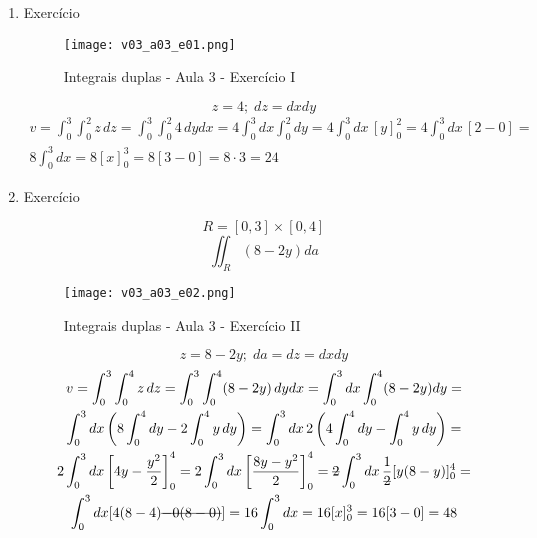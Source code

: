 \begin{enumerate}
	\item Exercício
	
	\begin{figure}[htb]
		\caption{Integrais duplas - Aula 3 - Exercício I}
		\label{v03_a03_e01}
		\centering
		\texttt{[image: v03\_a03\_e01.png]}		
	\end{figure}
	
	\begin{equation*}
		z = 4;\; dz = dx dy	
	\end{equation*}	
	\begin{gather*}
		v = \int_0^3 \int_0^2 z\, dz = \int_0^3 \int_0^2 4\, dy dx = 4\int_0^3 dx \int_0^2 dy = 4\int_0^3 dx\, [y]_0^2 = 4\int_0^3 dx\, [2 - 0] =\\ 8\int_0^3 dx = 8[x]_0^3 = 8[3 - 0] = 8 \cdot 3 = 24
	\end{gather*}
		
	\item Exercício
	
	\begin{equation*}
		R = [0, 3] \times [0,4]
	\end{equation*}
	\begin{equation*}
		\iint_R (8 - 2y) da
	\end{equation*}
	
	\begin{figure}[htb]
		\caption{Integrais duplas - Aula 3 - Exercício II}
		\label{v03_a03_e02}
		\centering
		\texttt{[image: v03\_a03\_e02.png]}		
	\end{figure}	
	
	\begin{equation*}
		z = 8 - 2y;\; da = dz = dx dy
	\end{equation*}
	\begin{gather*}
		v = \int_0^3 \int_0^4 z\,dz = \int_0^3 \int_0^4(8 - 2y)\, dy dx = \int_0^3 dx \int_0^4(8 - 2y) dy =\\ \int_0^3 dx \left(8\int_0^4 dy - 2\int_0^4 y\,dy\right) = \int_0^3 dx\, 2\left(4\int_0^4 dy - \int_0^4 y\,dy\right) =\\ 2\int_0^3 dx \left[4y - \dfrac{y^2}{2}\right]_0^4 = 2\int_0^3 dx \left[\dfrac{8y - y^2}{2}\right]_0^4 = \overstrike{2}\int_0^3 dx\, \dfrac{1}{\overstrike{2}}[y(8 - y)]_0^4 =\\ \int_0^3 dx[4(8 - 4) \overstrike{- 0(8 - 0)}] = 16\int_0^3 dx = 16[x]_0^3 = 16[3 - 0] = 48
	\end{gather*}
\end{enumerate}
